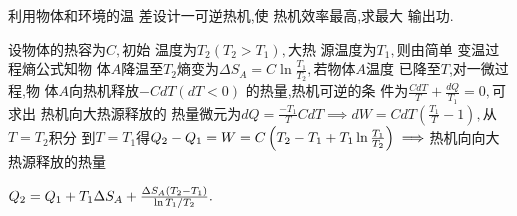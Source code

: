 \documentclass{article}
\begin{document}
利用物体和环境的温%
差设计一可逆热机,使%
热机效率最高,求最大%
输出功.

设物体的热容为$C,$初始%
温度为$T_{2}\left( T_{2}>T_{1}\right) ,$大热%
源温度为$T_{1},$则由简单%
变温过程熵公式知物%
体$A$降温至$T_{2}$熵变为$\Delta
S_{A}=C\ln \frac{T_{1}}{T_{2}},$若物体$A$温度%
已降至$T$,对一微过程,物%
体$A$向热机释放$-CdT\left( dT<0\right) $%
的热量,热机可逆的条%
件为$\frac{CdT}{T}+\frac{dQ}{T_{1}}=0,$可求出%
热机向大热源释放的%
热量微元为$dQ=\frac{-T_{1}}{T}CdT\implies
dW=CdT\left( \frac{T_{1}}{T}-1\right) ,$从$T=T_{2}$积分%
到$T=T_{1}$得$Q_{2}-Q_{1}=W=C\left( T_{2}-T_{1}+T_{1}\ln \frac{%
T_{1}}{T_{2}}\right) \implies $热机向向大%
热源释放的热量

$Q_{2}=Q_{1}+T_{1}\Delta S_{A}+\frac{\Delta S_{A}\left( T_{2}-T_{1}\right) }{%
\ln T_{1}/T_{2}}.$
\end{document}
